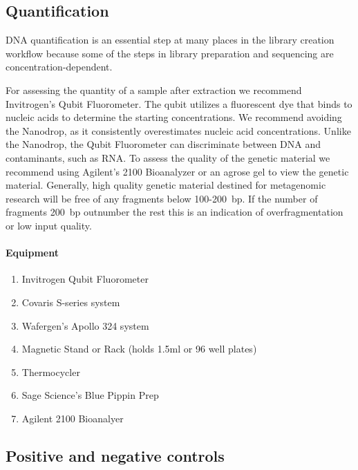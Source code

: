 \documentclass[graybox]{svmult}
\begin{document}
\subsection{Quantification}
DNA quantification is an essential step at many places in the library creation workflow because some of the steps in library preparation and sequencing are concentration-dependent.

For assessing the quantity of a sample after extraction we recommend Invitrogen’s Qubit Fluorometer. The qubit utilizes a fluorescent dye that binds to nucleic acids to determine the starting concentrations.  We recommend avoiding the Nanodrop, as it consistently overestimates nucleic acid concentrations. Unlike the Nanodrop, the Qubit Fluorometer can discriminate between DNA and contaminants, such as RNA.
%
To assess the quality of the genetic material we recommend using Agilent’s 2100 Bioanalyzer or an agrose gel to view the genetic material. Generally, high quality genetic material destined for metagenomic research will be free of any fragments below 100-200~bp.  If the number of fragments 200~bp outnumber the rest this is an indication of overfragmentation or low input quality.


\paragraph{Equipment}
\begin{svgraybox}
\begin{enumerate}
\item{    Invitrogen Qubit Fluorometer}
\item{      Covaris S-series system}
\item{      Wafergen’s Apollo 324 system}
\item{      Magnetic Stand or Rack (holds 1.5ml or 96 well plates)}
\item{      Thermocycler}
\item{      Sage Science’s Blue Pippin Prep}
\item{      Agilent 2100 Bioanalyer}
\end{enumerate}
\end{svgraybox}

\subsection{Positive and negative controls }
\end{document}
